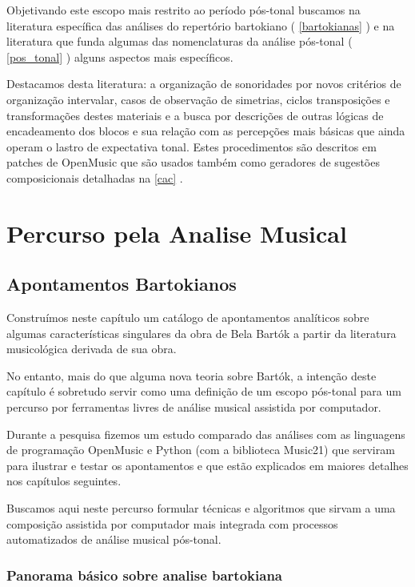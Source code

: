 \documentclass[
	12pt,				%
	openright,			%
	twoside,			%
	a4paper,			%
	english,			%
	french,				%
	spanish,			%
	brazil				%
	]{abntex2}
\begin{document}
Objetivando este escopo mais restrito ao período pós-tonal buscamos na literatura específica das análises do repertório bartokiano ( \autoref{bartokianas} ) e na literatura que funda algumas das nomenclaturas da análise pós-tonal ( \autoref{pos_tonal} ) alguns aspectos mais específicos. 

Destacamos desta literatura: a organização de sonoridades por novos critérios de organização intervalar, casos de observação de simetrias, ciclos transposições e transformações destes materiais e a busca por descrições de outras lógicas de encadeamento dos blocos e sua relação com as percepções mais básicas que ainda operam o lastro de expectativa tonal. Estes procedimentos são descritos em patches de OpenMusic que são usados também como geradores de sugestões composicionais detalhadas na \autoref{cac} .


\part{Percurso pela Analise Musical }


\chapter{Apontamentos Bartokianos}
\label{bartokianas}

Construímos neste capítulo um catálogo de apontamentos analíticos sobre algumas características singulares da obra de Bela Bartók a partir da literatura musicológica derivada de sua obra.

No entanto, mais do que alguma nova teoria sobre Bartók, a intenção deste capítulo é sobretudo servir como uma definição de um escopo pós-tonal para um percurso por ferramentas livres de análise musical assistida por computador.

Durante a pesquisa fizemos um estudo comparado das análises com as linguagens de programação OpenMusic e Python (com a biblioteca Music21)  que serviram para ilustrar e testar os apontamentos e que estão explicados em maiores detalhes nos capítulos seguintes.

Buscamos aqui neste percurso formular técnicas e algoritmos que sirvam a uma composição assistida por computador mais integrada com processos automatizados de análise musical pós-tonal.


\section{Panorama básico sobre analise bartokiana}
\end{document}
